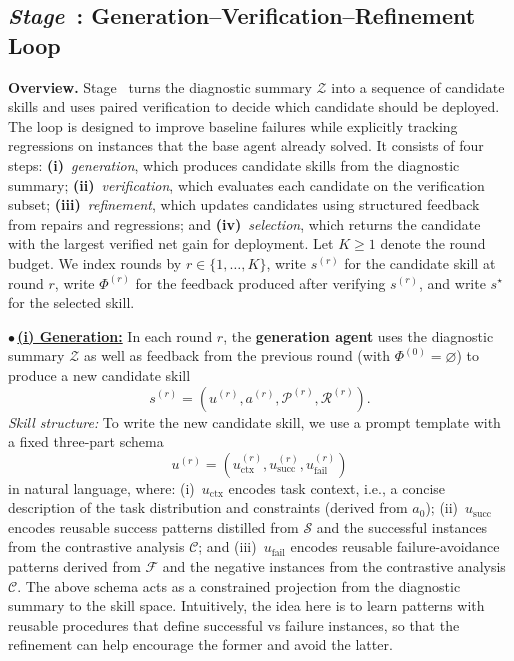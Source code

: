\documentclass{article}
\newcommand*\circledblue[1]{\tikz[baseline=(char.base)]{
            \node[shape=circle,draw=NavyBlue!100,fill=NavyBlue!10,thick,inner sep=1pt] (char) {\scriptsize\textsf#1};}}
\begin{document}
\subsection{\emph{Stage}~\texorpdfstring{\protect\circledblue{3}}{(3)}: Generation--Verification--Refinement Loop}
\label{sec:paired-verification}

\textbf{Overview.}
Stage~\circledblue{3} turns the diagnostic summary $\mathcal{Z}$ into a sequence of candidate skills and uses paired verification to decide which candidate should be deployed.
The loop is designed to improve baseline failures while explicitly tracking regressions on instances that the base agent already solved.
It consists of four steps:
\textbf{(i)}~\emph{generation}, which produces candidate skills from the diagnostic summary;
\textbf{(ii)}~\emph{verification}, which evaluates each candidate on the verification subset;
\textbf{(iii)}~\emph{refinement}, which updates candidates using structured feedback from repairs and regressions; and
\textbf{(iv)}~\emph{selection}, which returns the candidate with the largest verified net gain for deployment.
Let $K\ge1$ denote the round budget. We index rounds by $r\in\{1,\ldots,K\}$, write $s^{(r)}$ for the candidate skill at round $r$, write $\Phi^{(r)}$ for the feedback produced after verifying $s^{(r)}$, and write $s^\star$ for the selected skill.

$\bullet$\,\underline{\textbf{(i) Generation:}} In each round $r$, the \textbf{generation agent} uses the diagnostic summary $\mathcal{Z}$ as well as feedback from the previous round (with $\Phi^{(0)}=\varnothing$) to produce a new candidate skill
\begin{equation}
    s^{(r)}=(u^{(r)},a^{(r)},\mathcal{P}^{(r)},\mathcal{R}^{(r)}).
\end{equation}
\emph{Skill structure:} To write the new candidate skill, we use a prompt template with a fixed three-part schema
\begin{equation}
    u^{(r)}=(u^{(r)}_{\mathrm{ctx}},u^{(r)}_{\mathrm{succ}},u^{(r)}_{\mathrm{fail}})
\end{equation}
in natural language, where:
(i)~$u_{\mathrm{ctx}}$ encodes task context, i.e., a concise description of the task distribution and constraints (derived from $a_0$);
(ii)~$u_{\mathrm{succ}}$ encodes reusable success patterns distilled from $\mathcal{S}$ and the successful instances from the contrastive analysis $\mathcal{C}$; and
(iii)~$u_{\mathrm{fail}}$ encodes reusable failure-avoidance patterns derived from $\mathcal{F}$ and the negative instances from the contrastive analysis $\mathcal{C}$.
The above schema acts as a constrained projection from the diagnostic summary to the skill space. Intuitively, the idea here is to learn patterns with reusable procedures that define successful vs failure instances, so that the refinement can help encourage the former and avoid the latter.
\end{document}
